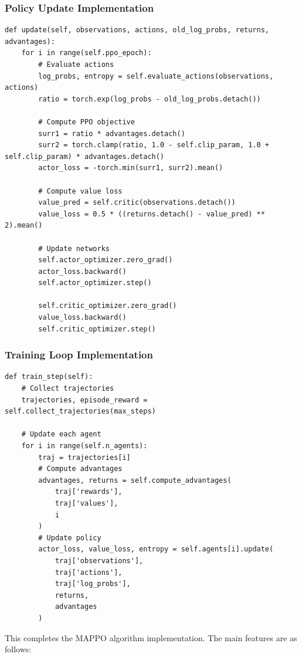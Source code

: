 \documentclass[12pt]{article}
\begin{document}
\subsubsection{Policy Update Implementation}
\begin{verbatim}
def update(self, observations, actions, old_log_probs, returns, advantages):
    for i in range(self.ppo_epoch):
        # Evaluate actions
        log_probs, entropy = self.evaluate_actions(observations, actions)
        ratio = torch.exp(log_probs - old_log_probs.detach())
        
        # Compute PPO objective
        surr1 = ratio * advantages.detach()
        surr2 = torch.clamp(ratio, 1.0 - self.clip_param, 1.0 + self.clip_param) * advantages.detach()
        actor_loss = -torch.min(surr1, surr2).mean()
        
        # Compute value loss
        value_pred = self.critic(observations.detach())
        value_loss = 0.5 * ((returns.detach() - value_pred) ** 2).mean()
        
        # Update networks
        self.actor_optimizer.zero_grad()
        actor_loss.backward()
        self.actor_optimizer.step()
        
        self.critic_optimizer.zero_grad()
        value_loss.backward()
        self.critic_optimizer.step()
\end{verbatim}

\subsubsection{Training Loop Implementation}
\begin{verbatim}
def train_step(self):
    # Collect trajectories
    trajectories, episode_reward = self.collect_trajectories(max_steps)
    
    # Update each agent
    for i in range(self.n_agents):
        traj = trajectories[i]
        # Compute advantages
        advantages, returns = self.compute_advantages(
            traj['rewards'],
            traj['values'],
            i
        )
        # Update policy
        actor_loss, value_loss, entropy = self.agents[i].update(
            traj['observations'],
            traj['actions'],
            traj['log_probs'],
            returns,
            advantages
        )
\end{verbatim}

This completes the MAPPO algorithm implementation. The main features are as follows:
\end{document}
